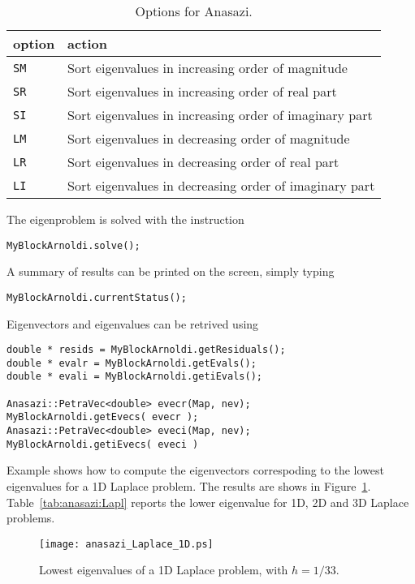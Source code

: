 \begin{table}
\begin{center}
\begin{tabular}{| p{2cm} l |}
\hline
option & action \\
\hline

{\tt SM} & Sort eigenvalues in increasing order of magnitude \\

{\tt SR} & Sort eigenvalues in increasing order of real part \\

{\tt SI} & Sort eigenvalues in increasing order of imaginary part \\

{\tt LM} & Sort eigenvalues in decreasing order of magnitude \\

{\tt LR} & Sort eigenvalues in decreasing order of real part \\

{\tt LI} & Sort eigenvalues in decreasing order of imaginary part \\
\hline
\end{tabular}
\caption{Options for Anasazi.}
\label{tab:anasazi}
\end{center}
\end{table}


The eigenproblem is solved with the instruction
\begin{verbatim}
MyBlockArnoldi.solve();
\end{verbatim}
A summary of results can be printed on the screen, simply typing
\begin{verbatim}
MyBlockArnoldi.currentStatus();
\end{verbatim}
Eigenvectors and eigenvalues can be retrived using
\begin{verbatim}
double * resids = MyBlockArnoldi.getResiduals();
double * evalr = MyBlockArnoldi.getEvals(); 
double * evali = MyBlockArnoldi.getiEvals();

Anasazi::PetraVec<double> evecr(Map, nev);
MyBlockArnoldi.getEvecs( evecr );
Anasazi::PetraVec<double> eveci(Map, nev);
MyBlockArnoldi.getiEvecs( eveci )
\end{verbatim}

Example  shows how to compute the eigenvectors
correspoding to the lowest eigenvalues for a 1D Laplace problem. The
results are shows in Figure~\ref{fig:anasazi:1D}.
Table~\ref{tab:anasazi:Lapl} reports the lower eigenvalue for 1D, 2D and
3D Laplace problems.
\begin{figure}[htbp]
  \centering
  \texttt{[image: anasazi\_Laplace\_1D.ps]}
  \caption{Lowest eigenvalues of a 1D Laplace problem, with $h=1/33$.}
  \label{fig:anasazi:1D}
\end{figure}


